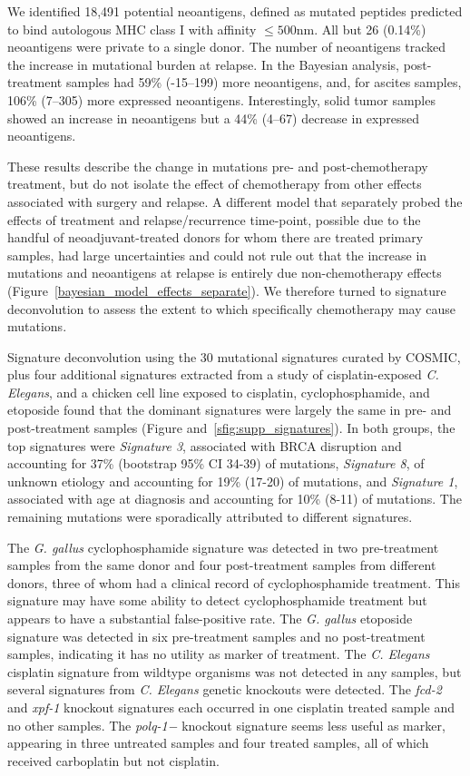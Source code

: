 We identified 18,491 potential neoantigens, defined as mutated peptides predicted to bind autologous MHC class I with affinity $\leq 500$nm. All but 26 (0.14\%) neoantigens were private to a single donor. The number of neoantigens tracked the increase in mutational burden at relapse. In the Bayesian analysis, post-treatment samples had 59\% (-15--199) more neoantigens, and, for ascites samples, 106\% (7--305) more expressed neoantigens. Interestingly, solid tumor samples showed an increase in neoantigens but a 44\% (4--67) decrease in expressed neoantigens.

These results describe the change in mutations pre- and post-chemotherapy treatment, but do not isolate the effect of chemotherapy from other effects associated with surgery and relapse. A different model that separately probed the effects of treatment and relapse/recurrence time-point, possible due to the handful of neoadjuvant-treated donors for whom there are treated primary samples, had large uncertainties and could not rule out that the increase in mutations and neoantigens at relapse is entirely due non-chemotherapy effects (Figure~\ref{bayesian_model_effects_separate}). We therefore turned to signature deconvolution to assess the extent to which specifically chemotherapy may cause mutations.

Signature deconvolution using the 30 mutational signatures curated by COSMIC\cite{364242}, plus four additional signatures extracted from a study of cisplatin-exposed \textit{C. Elegans}\cite{Meier_2014}, and a chicken cell line exposed to cisplatin, cyclophosphamide, and etoposide\cite{Szikriszt_2016} found that the dominant signatures were largely the same in pre- and post-treatment samples (Figure and~\ref{sfig:supp_signatures}). In both groups, the top signatures were \textit{Signature 3}, associated with BRCA disruption and accounting for 37\% (bootstrap 95\% CI 34-39) of mutations, \textit{Signature 8}, of unknown etiology and accounting for 19\% (17-20) of mutations, and \textit{Signature 1}, associated with age at diagnosis and accounting for 10\% (8-11) of mutations. The remaining mutations were sporadically attributed to different signatures.

The \textit{G. gallus} cyclophosphamide signature was detected in two pre-treatment samples from the same donor and four post-treatment samples from different donors, three of whom had a clinical record of cyclophosphamide treatment. This signature may have some ability to detect cyclophosphamide treatment but appears to have a substantial false-positive rate. The \textit{G. gallus} etoposide signature was detected in six pre-treatment samples and no post-treatment samples, indicating it has no utility as marker of treatment. The \textit{C. Elegans} cisplatin signature from wildtype organisms was not detected in any samples, but several signatures from \textit{C. Elegans} genetic knockouts were detected. The \textit{fcd-2} and \textit{xpf-1} knockout signatures each occurred in one cisplatin treated sample and no other samples. The \textit{polq-1−} knockout signature seems less useful as marker, appearing in three untreated samples and four treated samples, all of which received carboplatin but not cisplatin.

